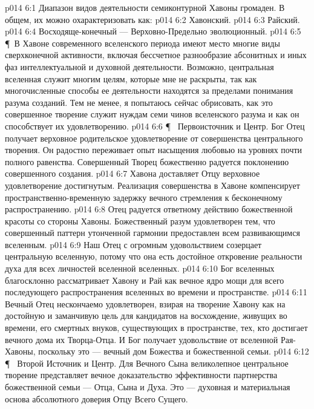 \vs p014 6:1 Диапазон видов деятельности семиконтурной Хавоны громаден. В общем, их можно охарактеризовать как:
\vs p014 6:2 \bibnobreakspace Хавонский.
\vs p014 6:3 \bibnobreakspace Райский.
\vs p014 6:4 \bibnobreakspace Восходяще\hyp{}конечный --- Верховно\hyp{}Предельно эволюционный.
\vs p014 6:5 \P\ В Хавоне современного вселенского периода имеют место многие виды сверхконечной активности, включая бессчетное разнообразие абсонитных и иных фаз интеллектуальной и духовной деятельности. Возможно, центральная вселенная служит многим целям, которые мне не раскрыты, так как многочисленные способы ее деятельности находятся за пределами понимания разума созданий. Тем не менее, я попытаюсь сейчас обрисовать, как это совершенное творение служит нуждам семи чинов вселенского разума и как он способствует их удовлетворению.
\vs p014 6:6 \P\ \bibnobreakspace {} Первоисточник и Центр. Бог Отец получает верховное родительское удовлетворение от совершенства центрального творения. Он радостно переживает опыт насыщения любовью на уровнях почти полного равенства. Совершенный Творец божественно радуется поклонению совершенного создания.
\vs p014 6:7 Хавона доставляет Отцу верховное удовлетворение достигнутым. Реализация совершенства в Хавоне компенсирует пространственно\hyp{}временную задержку вечного стремления к бесконечному распространению.
\vs p014 6:8 Отец радуется ответному действию божественной красоты со стороны Хавоны. Божественный разум удовлетворен тем, что совершенный паттерн утонченной гармонии предоставлен всем развивающимся вселенным.
\vs p014 6:9 Наш Отец с огромным удовольствием созерцает центральную вселенную, потому что она есть достойное откровение реальности духа для всех личностей вселенной вселенных.
\vs p014 6:10 Бог вселенных благосклонно рассматривает Хавону и Рай как вечное ядро мощи для всего последующего распространения вселенных во времени и пространстве.
\vs p014 6:11 Вечный Отец нескончаемо удовлетворен, взирая на творение Хавону как на достойную и заманчивую цель для кандидатов на восхождение, живущих во времени, его смертных внуков, существующих в пространстве, тех, кто достигает вечного дома их Творца\hyp{}Отца. И Бог получает удовольствие от вселенной Рая\hyp{}Хавоны, поскольку это --- вечный дом Божества и божественной семьи.
\vs p014 6:12 \P\ \bibnobreakspace {} Второй Источник и Центр. Для Вечного Сына великолепное центральное творение представляет вечное доказательство эффективности партнерства божественной семьи --- Отца, Сына и Духа. Это --- духовная и материальная основа абсолютного доверия Отцу Всего Сущего.
